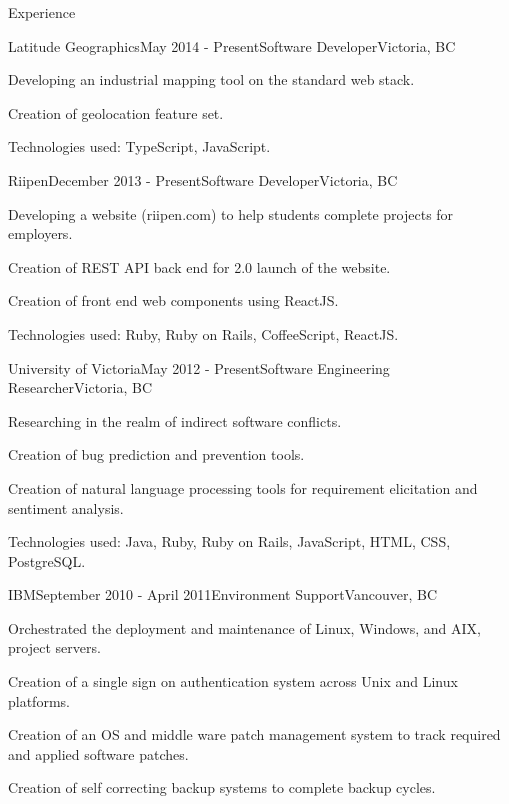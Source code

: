 \documentclass{resume} %
\begin{document}
\begin{rSection}{Experience}


\begin{rSubsection}{Latitude Geographics}{May 2014 - Present}{Software Developer}{Victoria, BC}
\item Developing an industrial mapping tool on the standard web stack.
\item Creation of geolocation feature set.
\item Technologies used: TypeScript, JavaScript.
\end{rSubsection}

\begin{rSubsection}{Riipen}{December 2013 - Present}{Software Developer}{Victoria, BC}
\item Developing a website (riipen.com) to help students complete projects for employers.
\item Creation of REST API back end for 2.0 launch of the website.
\item Creation of front end web components using ReactJS.
\item Technologies used: Ruby, Ruby on Rails, CoffeeScript, ReactJS.
\end{rSubsection}


\begin{rSubsection}{University of Victoria}{May 2012 - Present}{Software Engineering Researcher}{Victoria, BC}
\item Researching in the realm of indirect software conflicts.
\item Creation of bug prediction and prevention tools.
\item Creation of natural language processing tools for requirement elicitation and sentiment analysis.
\item Technologies used: Java, Ruby, Ruby on Rails, JavaScript, HTML, CSS, PostgreSQL.
\end{rSubsection}


\begin{rSubsection}{IBM}{September 2010 - April 2011}{Environment Support}{Vancouver, BC}
\item Orchestrated the deployment and maintenance of Linux, Windows, and AIX, project servers.
\item Creation of a single sign on authentication system across Unix and Linux platforms.
\item Creation of an OS and middle ware patch management system to track required and applied software patches.
\item Creation of self correcting backup systems to complete backup cycles.
\end{rSubsection}


\end{rSection}
\end{document}
